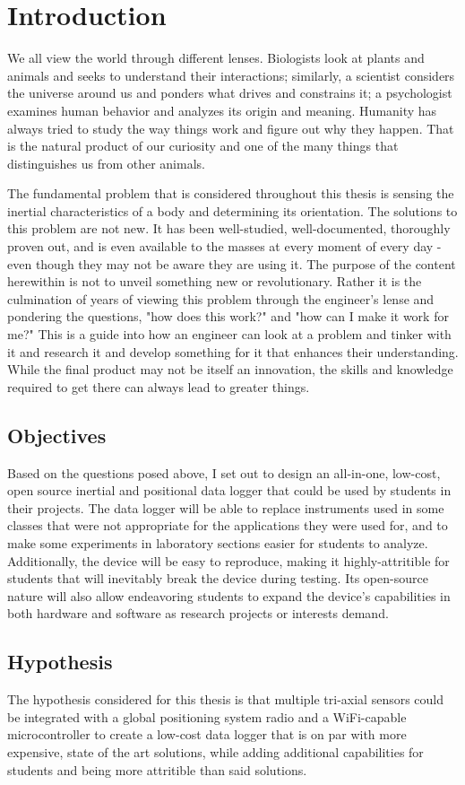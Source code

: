 \chapter{Introduction}\label{chap:intro}
We all view the world through different lenses.
Biologists look at plants and animals and seeks to understand their interactions;
similarly, a scientist considers the universe around us and ponders what drives and constrains it;
a psychologist examines human behavior and analyzes its origin and meaning.
Humanity has always tried to study the way things work and figure out why they happen.
That is the natural product of our curiosity and one of the many things that distinguishes us from other animals.

The fundamental problem that is considered throughout this thesis is sensing the inertial characteristics of a body and determining its orientation.
The solutions to this problem are not new.
It has been well-studied, well-documented, thoroughly proven out, and is even available to the masses at every moment of every day - even though they may not be aware they are using it.
The purpose of the content herewithin is not to unveil something new or revolutionary.
Rather it is the culmination of years of viewing this problem through the engineer's lense and pondering the questions, "how does this work?" and "how can I make it work for me?"
This is a guide into how an engineer can look at a problem and tinker with it and research it and develop something for it that enhances their understanding.
While the final product may not be itself an innovation, the skills and knowledge required to get there can always lead to greater things.

\section{Objectives}
Based on the questions posed above, I set out to design an all-in-one, low-cost, open source inertial and positional data logger that could be used by students in their projects.
The data logger will be able to replace instruments used in some classes that were not appropriate for the applications they were used for, and to make some experiments in laboratory sections easier for students to analyze.
Additionally, the device will be easy to reproduce, making it highly-attritible for students that will inevitably break the device during testing.
Its open-source nature will also allow endeavoring students to expand the device's capabilities in both hardware and software as research projects or interests demand.

\section{Hypothesis}
The hypothesis considered for this thesis is that multiple tri-axial sensors could be integrated with a global positioning system radio and a WiFi-capable microcontroller to create a low-cost data logger that is on par with more expensive, state of the art solutions, while adding additional capabilities for students and being more attritible than said solutions.
